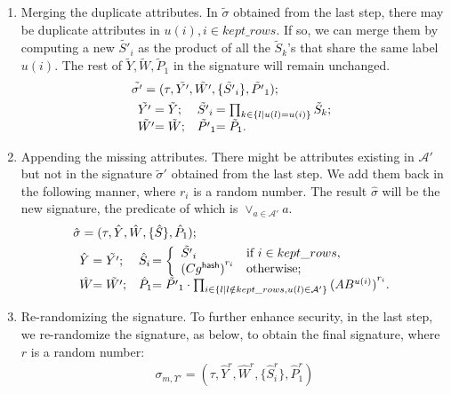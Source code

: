 \begin{enumerate}
  \item Merging the duplicate attributes. In $\tilde{\sigma}$ obtained from the last step, there may be duplicate attributes in $u(i), i \in kept\_rows$. If so, we can merge them by computing a new $\tilde{S'}_i$ as the product of all the $\tilde{S}_k$'s that share the same label $u(i)$. The rest of $\tilde{Y}, \tilde{W}, \tilde{P}_1$ in the signature will remain unchanged.
    \begin{align*}
              & \tilde{\sigma'} = (\tau,\tilde{Y'},\tilde{W'},\{\tilde{S'}_i\}, \tilde{P'}_1); \\
              & \begin{array}{l@{}ll@{}l}
                \tilde{Y'} & = \tilde{Y}; &
                \tilde{S'}_i & = \prod_{k \in \{l | u(l) = u(i)\}} \tilde{S}_k;
                \\
                \tilde{W'} & = \tilde{W}; &
                \tilde{P'}_1 & = \tilde{P}_1.
              \end{array}
    \end{align*}
  \item Appending the missing attributes. There might be attributes existing in $\mathcal{A}'$ but not in the signature $\tilde{\sigma}'$ obtained from the last step. We add them back in the following manner, where $r_i$ is a random number. The result $\hat{\sigma}$ will be the new signature, the predicate of which is $\lor_{a\in\mathcal{A}'}a$.\label{abs-relax-step-appending-missing-attributes}
    \begin{align*}
              & \hat{\sigma} = (\tau,\hat{Y}, \hat{W}, \{\hat{S}\}, \hat{P}_1); \\
              & \begin{array}{l@{}ll@{}l}
                \hat{Y} & = \tilde{Y'}; &
                \hat{S}_i &= \left\{\begin{array}{ll}
                    \tilde{S'}_i & \text{if } i \in kept\_rows, \\
                    {(Cg^{\hash})}^{r_i}         & \text{otherwise};
                \end{array}\right.
                \\
                    \hat{W} & = \tilde{W'}; &
                    \hat{P}_1 &= \tilde{P'}_1 \cdot
                    \prod_{i \in\{l|l \notin{} kept\_rows, u(l) \in\mathcal{A}'\}}{(AB^{u(i)})}^{r_i}. %
                  \end{array}
    \end{align*}
  \item Re-randomizing the signature. To further enhance security, in the last step, we re-randomize the signature, as below, to obtain the final signature, where $r$ is a random number:
    \begin{align*}
      \sigma_{m,\Upsilon'} = (\tau,\hat{Y}^r, \hat{W}^r, \{\hat{S}_i^r\}, \hat{P}_1^r)
    \end{align*}
\end{enumerate}

